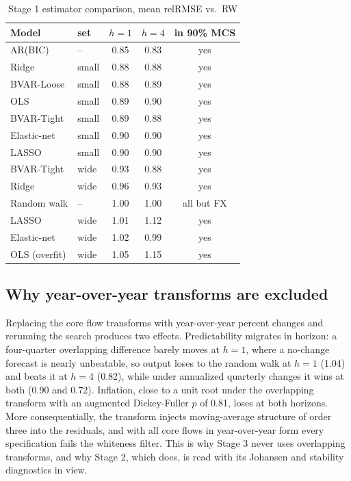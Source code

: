 \documentclass[conference]{IEEEtran}
\begin{document}
\begin{table}[t]
\caption{Stage 1 estimator comparison, mean relRMSE vs.\ RW}
\label{tab:phase2}
\centering
\small
\begin{tabular}{@{}llccc@{}}
\toprule
Model & set & $h{=}1$ & $h{=}4$ & in 90\% MCS \\
\midrule
AR(BIC)            & --    & 0.85 & 0.83 & yes \\
Ridge              & small & 0.88 & 0.88 & yes \\
BVAR-Loose         & small & 0.88 & 0.89 & yes \\
OLS                & small & 0.89 & 0.90 & yes \\
BVAR-Tight         & small & 0.89 & 0.88 & yes \\
Elastic-net        & small & 0.90 & 0.90 & yes \\
LASSO              & small & 0.90 & 0.90 & yes \\
BVAR-Tight         & wide  & 0.93 & 0.88 & yes \\
Ridge              & wide  & 0.96 & 0.93 & yes \\
Random walk        & --    & 1.00 & 1.00 & all but FX \\
LASSO              & wide  & 1.01 & 1.12 & yes \\
Elastic-net        & wide  & 1.02 & 0.99 & yes \\
OLS (overfit)      & wide  & 1.05 & 1.15 & yes \\
\bottomrule
\end{tabular}
\end{table}

\subsection{Why year-over-year transforms are excluded}
Replacing the core flow transforms with year-over-year percent changes and rerunning the search produces two effects. Predictability migrates in horizon: a four-quarter overlapping difference barely moves at $h=1$, where a no-change forecast is nearly unbeatable, so output loses to the random walk at $h=1$ (1.04) and beats it at $h=4$ (0.82), while under annualized quarterly changes it wins at both (0.90 and 0.72). Inflation, close to a unit root under the overlapping transform with an augmented Dickey-Fuller $p$ of 0.81, loses at both horizons. More consequentially, the transform injects moving-average structure of order three into the residuals, and with all core flows in year-over-year form every specification fails the whiteness filter. This is why Stage 3 never uses overlapping transforms, and why Stage 2, which does, is read with its Johansen and stability diagnostics in view.
\end{document}

